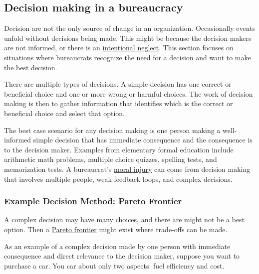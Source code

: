 \subsection{Decision making in a bureaucracy\label{sec:decision-making}}


Decision are not the only source of change in an organization. Occasionally events unfold without decisions being made. This might be because the decision makers are not informed, or there is an \href{https://en.wikipedia.org/wiki/Willful_blindness}{intentional neglect}. This section focuses on situations where bureaucrats recognize the need for a decision and want to make the best decision.

There are multiple types of decisions. 
A \gls{simple decision} has one correct or beneficial choice and one or more wrong or harmful choices. The work of decision making is then to gather information that identifies which is the correct or beneficial choice and select that option.

The best case scenario for any decision making is one person making a well-informed simple decision that has immediate consequence and the consequence is to the decision maker. Examples from elementary formal education include arithmetic math problems, multiple choice quizzes, spelling tests, and memorization tests. A bureaucrat's \href{https://en.wikipedia.org/wiki/Moral_injury}{moral injury} can come from decision making that involves multiple people, weak feedback loops, and complex decisions.

\subsubsection{Example Decision Method: Pareto Frontier\label{sec:pareto}}

A complex decision may have many choices, and there are might not be a best option. Then a \href{https://en.wikipedia.org/wiki/Pareto_front}{Pareto frontier} might exist where trade-offs can be made. 

As an example of a complex decision made by one person with immediate consequence and direct relevance to the decision maker, suppose you want to purchase a car. You car about only two aspects: fuel efficiency and cost. 

